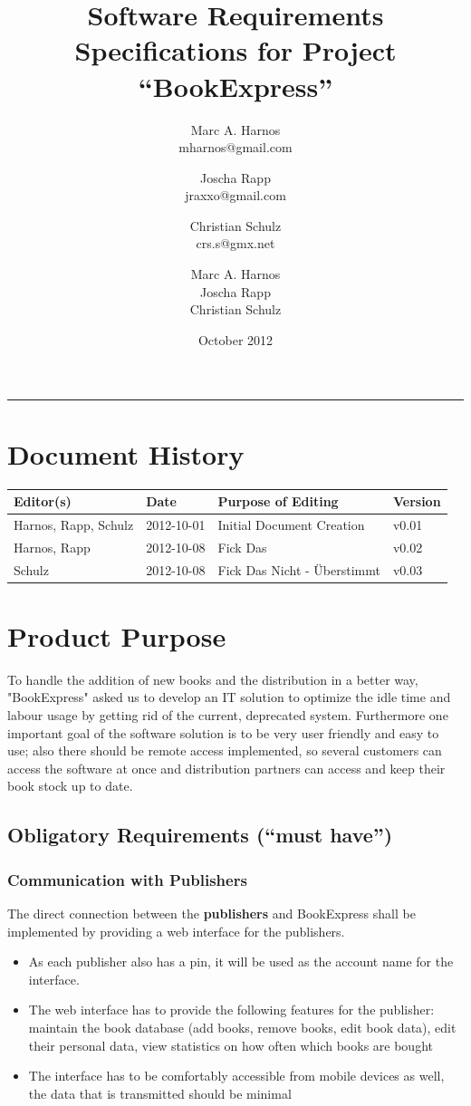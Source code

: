 \documentclass[11pt,a4paper,oneside,svgnames]{report}
\title{Software Requirements Specifications for Project ``BookExpress''}
\author{Marc A. Harnos\\ {mharnos@gmail.com} \and Joscha Rapp\\ {jraxxo@gmail.com} \and Christian Schulz\\ {crs.s@gmx.net}}
\author{Marc A. Harnos\\ Joscha Rapp\\ Christian Schulz}
\date{October 2012}
\makeatletter
\renewcommand{\maketitle}{\begin{titlepage}%
    \let\footnotesize\small
    \let\footnoterule\relax
    \parindent \z@
    \reset@font
    \null\vfil
    \begin{flushleft}
      \huge \@title
    \end{flushleft}
    \par
    \hrule height 4pt
    \par
    \begin{flushright}
      \LARGE \@author \par
    \end{flushright}
    \vskip 60\p@
    \vfil\null
  \end{titlepage}%
  \setcounter{footnote}{0}%
}
\makeatother
\begin{document}
\maketitle
\tableofcontents

\chapter*{Document History}

\begin{center}

\begin{tabular}{|l|l|l|l|}
\hline 
Editor(s) & Date & Purpose of Editing & Version \\ 
\hline 
Harnos, Rapp, Schulz & 2012-10-01 & Initial Document Creation & v0.01 \\ 
\hline
Harnos, Rapp & 2012-10-08 & Fick Das & v0.02 \\ 
\hline
Schulz & 2012-10-08 & Fick Das Nicht - Überstimmt & v0.03 \\ 
\hline 
\end{tabular} 

\end{center}

\chapter{Product Purpose}
To handle the addition of new books and the distribution in a better way, "BookExpress" asked us to develop an IT solution to optimize the idle time and labour usage by getting rid of the current, deprecated system. Furthermore one important goal of the software solution is to be very user friendly and easy to use; also there should be remote access implemented, so several customers can access the software at once and distribution partners can access and keep their book stock up to date.
\section{Obligatory Requirements (``must have'')}
\subsection{Communication with Publishers}
The direct connection between the \textbf{publishers} and BookExpress shall be implemented by providing a web interface for the publishers.\\
\begin{itemize}
\item As each publisher also has a \gls{pin}, it will be used as the account name for the interface.
\item The web interface has to provide the following features for the publisher: maintain the book database (add books, remove books, edit book data), edit their personal data, view statistics on how often which books are bought
\item The interface has to be comfortably accessible from mobile devices as well, the data that is transmitted should be minimal\\
\end{itemize}
\end{document}
